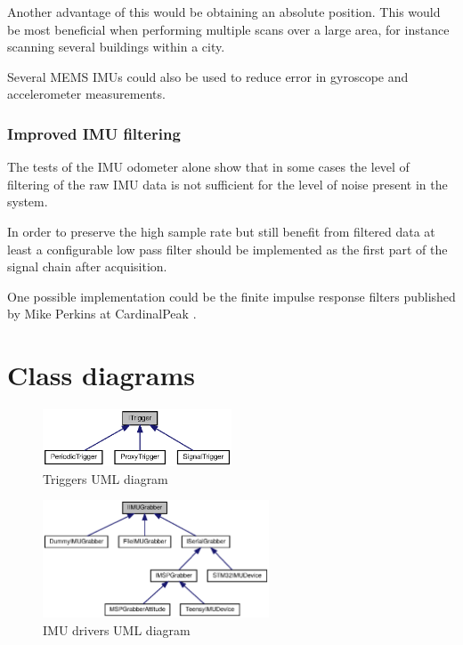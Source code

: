 \documentclass{entcs}
\begin{document}
Another advantage of this would be obtaining an absolute position. This would be
most beneficial when performing multiple scans over a large area, for instance
scanning several buildings within a city.

Several MEMS IMUs could also be used to reduce error in gyroscope and
accelerometer measurements.

\subsubsection{Improved IMU filtering}

The tests of the IMU odometer alone show that in some cases the level of
filtering of the raw IMU data is not sufficient for the level of noise present
in the system.

In order to preserve the high sample rate but still benefit from filtered data
at least a configurable low pass filter should be implemented as the first part
of the signal chain after acquisition.

One possible implementation could be the finite impulse response filters
published by Mike Perkins at CardinalPeak \cite{perkins_fir_filters}.

\printbibliography

\appendix

\section{Class diagrams}

\begin{figure}[h!]
  \centering
  \includegraphics[width=0.5\textwidth]{graphics/triggers_class_diag.eps}
  \caption{Triggers UML diagram}
  \label{fig:framework_triggers}
\end{figure}

\begin{figure}[h!]
  \centering
  \includegraphics[width=0.6\textwidth]{graphics/imu_class_diag.eps}
  \caption{IMU drivers UML diagram}
  \label{fig:framework_imu}
\end{figure}
\end{document}
